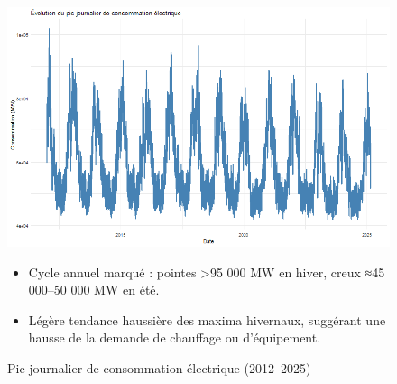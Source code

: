 \documentclass[12pt,a4paper]{article}
\begin{document}
\begin{figure}[H]
  \centering
  \begin{minipage}[t]{0.48\textwidth}
    \centering
    \includegraphics[width=\linewidth]{Projet_partie_A/graphique_conso.png}
    \caption{Pic journalier de consommation électrique (2012–2025)}
    \label{fig:conso_journaliere}
  \end{minipage}
  \hfill
  \begin{minipage}[t]{0.48\textwidth}
    \begin{itemize}
      \item Cycle annuel marqué : pointes >95 000 MW en hiver, creux ≈45 000–50 000 MW en été.  
      \item Légère tendance haussière des maxima hivernaux, suggérant une hausse de la demande de chauffage ou d’équipement.  
    \end{itemize}
  \end{minipage}
\end{figure}
\end{document}
